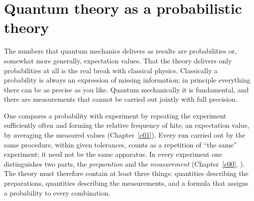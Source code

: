 %

\chapter{Quantum theory as a probabilistic theory}\label{c04}

The numbers that quantum mechanics delivers as results are probabilities or, somewhat more
generally, expectation values. That the theory delivers only probabilities at all is the real
break with classical physics. Classically a probability is always an expression of missing
information; in principle everything there can be as precise as you like. Quantum mechanically
it is fundamental, and there are measurements that cannot be carried out jointly with full
precision.

One compares a probability with experiment by repeating the experiment sufficiently often and
forming the relative frequency of hits; an expectation value, by averaging the measured values
(Chapter~\ref{c01}). Every run carried out by the same procedure, within given tolerances, counts
as a repetition of ``the same'' experiment; it need not be the same apparatus. In every experiment
one distinguishes two parts, the \emph{preparation} and the \emph{measurement}
(Chapter~\ref{c00}, ). The theory must therefore contain at least three things:
quantities describing the preparations, quantities describing the measurements, and a formula
that assigns a probability to every combination.


